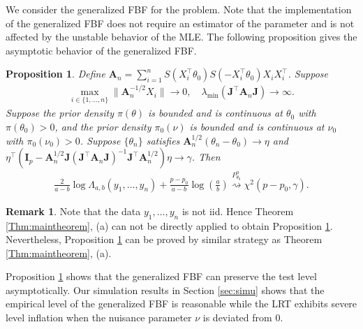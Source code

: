 \documentclass[11pt]{article}
\newcommand{\BA}{\mathbf{A}}    \newcommand{\BB}{\mathbf{B}}    \newcommand{\BC}{\mathbf{C}}    \newcommand{\BD}{\mathbf{D}}    \newcommand{\BE}{\mathbf{E}}    \newcommand{\BF}{\mathbf{F}}    \newcommand{\BG}{\mathbf{G}}    \newcommand{\BH}{\mathbf{H}}    \newcommand{\BI}{\mathbf{I}}    \newcommand{\BJ}{\mathbf{J}}    \newcommand{\BK}{\mathbf{K}}    \newcommand{\BL}{\mathbf{L}}
\newcommand{\myT}{\intercal}
\theoremstyle{plain}
\newtheorem{proposition}{\quad\quad Proposition}
\theoremstyle{definition}
\newtheorem{remark}{\quad\quad Remark}
\theoremstyle{remark}
\begin{document}
We consider the generalized FBF for the problem.
Note that the implementation of the generalized FBF does not require an estimator of the parameter and is not affected by the unstable behavior of the MLE.
The following proposition gives the asymptotic behavior of the generalized FBF.
\begin{proposition}
    \label{prop:logistic}
    Define $
 \BA_n = 
    \sum_{i=1}^n 
    S( X_i^\myT \theta_0)
    S(- X_i^\myT \theta_0)
    X_i
    X_i^\myT $.
    Suppose
    \begin{align*}
     \max_{i\in \{1,\dots,n\}}
 \|\BA_n^{-1/2}
 X_i\| \to 0
 ,\quad
 \lambda_{\min}(\BJ^\myT \BA_n \BJ) \to \infty.
    \end{align*}
    Suppose the prior density $\pi(\theta)$ is bounded and is continuous at $\theta_0$ with $\pi(\theta_0)> 0$, and the prior density $\pi_0(\nu)$ is bounded and is continuous at $\nu_0$ with $\pi_0(\nu_0)> 0$.
Suppose $\{\theta_n\}$ satisfies $\BA_n^{1/2} (\theta_n - \theta_0) \to \eta$ and $
    \eta^\myT 
    (
        \BI_p-
    \BA_n^{1/2} \BJ ( \BJ^\myT \BA_n \BJ )^{-1} \BJ^\myT \BA_n^{1/2}  
)
\eta
\to \gamma
$.
Then
\begin{align*}
    \frac{2}{a-b}\log \Lambda_{a, b} (y_1, \dots, y_n)
    +
    \frac{p-p_0}{a-b} \log \left(\frac{a}{b}\right)
    \overset{P_{\theta_0}^n}{\rightsquigarrow}
    \chi^2 (p-p_0, \gamma)
.
\end{align*}
\end{proposition}
\begin{remark}
    Note that the data $y_1, \dots, y_n$ is not iid.
    Hence Theorem \ref{Thm:maintheorem}, (a) can not be directly applied to obtain Proposition \ref{prop:logistic}.
    Nevertheless, Proposition \ref{prop:logistic} can be proved by similar strategy as Theorem \ref{Thm:maintheorem}, (a).
\end{remark}
Proposition \ref{prop:logistic} shows that the generalized FBF can preserve the test level asymptotically.
Our simulation results in Section \ref{sec:simu} shows that the empirical level of the generalized FBF is reasonable while the LRT exhibits severe level inflation when the nuisance parameter $\nu$ is deviated from $0$.
\end{document}
